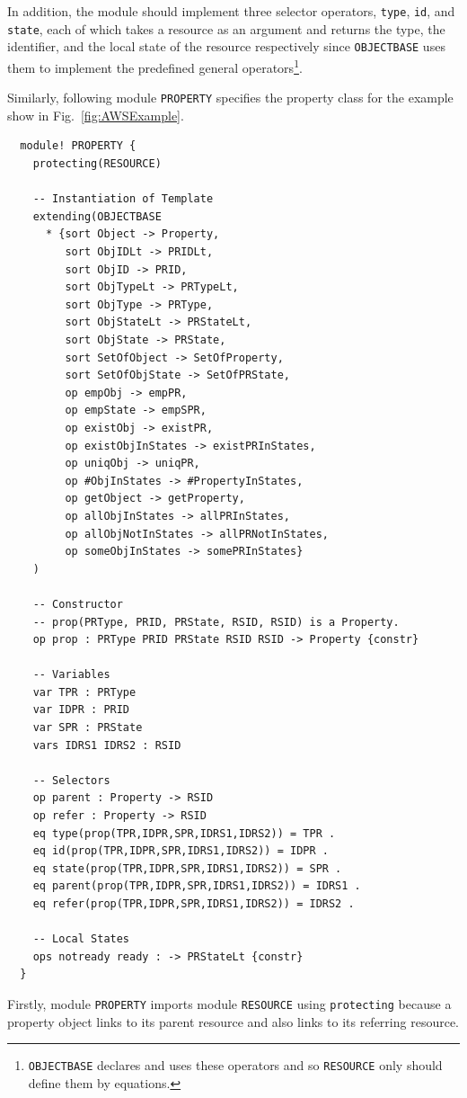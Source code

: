 \documentclass[12pt]{report}
\begin{document}
In addition, the module should implement three selector operators,
{\tt type}, {\tt id}, and {\tt state}, each of which takes a resource
as an argument and returns the type, the identifier, and the local
state of the resource respectively since {\tt OBJECTBASE} uses them to
implement the predefined general operators\footnote{{\tt OBJECTBASE}
  declares and uses these operators and so {\tt RESOURCE} only should
  define them by equations.}.

Similarly, following module {\tt PROPERTY} specifies the property class 
for the example show in Fig.~\ref{fig:AWSExample}.
\small
\begin{verbatim}
  module! PROPERTY {
    protecting(RESOURCE)
  
    -- Instantiation of Template
    extending(OBJECTBASE
      * {sort Object -> Property,
         sort ObjIDLt -> PRIDLt,
         sort ObjID -> PRID,
         sort ObjTypeLt -> PRTypeLt,
         sort ObjType -> PRType,
         sort ObjStateLt -> PRStateLt,
         sort ObjState -> PRState,
         sort SetOfObject -> SetOfProperty,
         sort SetOfObjState -> SetOfPRState,
         op empObj -> empPR,
         op empState -> empSPR,
         op existObj -> existPR,
         op existObjInStates -> existPRInStates,
         op uniqObj -> uniqPR,
         op #ObjInStates -> #PropertyInStates,
         op getObject -> getProperty,
         op allObjInStates -> allPRInStates,
         op allObjNotInStates -> allPRNotInStates,
         op someObjInStates -> somePRInStates}
    )
  
    -- Constructor
    -- prop(PRType, PRID, PRState, RSID, RSID) is a Property.
    op prop : PRType PRID PRState RSID RSID -> Property {constr}
  
    -- Variables
    var TPR : PRType
    var IDPR : PRID
    var SPR : PRState
    vars IDRS1 IDRS2 : RSID
  
    -- Selectors
    op parent : Property -> RSID
    op refer : Property -> RSID
    eq type(prop(TPR,IDPR,SPR,IDRS1,IDRS2)) = TPR .
    eq id(prop(TPR,IDPR,SPR,IDRS1,IDRS2)) = IDPR .
    eq state(prop(TPR,IDPR,SPR,IDRS1,IDRS2)) = SPR .
    eq parent(prop(TPR,IDPR,SPR,IDRS1,IDRS2)) = IDRS1 .
    eq refer(prop(TPR,IDPR,SPR,IDRS1,IDRS2)) = IDRS2 .
  
    -- Local States
    ops notready ready : -> PRStateLt {constr}
  }
\end{verbatim}
\normalsize
Firstly, module {\tt PROPERTY} imports module {\tt RESOURCE} using
{\tt protecting} because a property object links to its parent
resource and also links to its referring resource.
\end{document}
